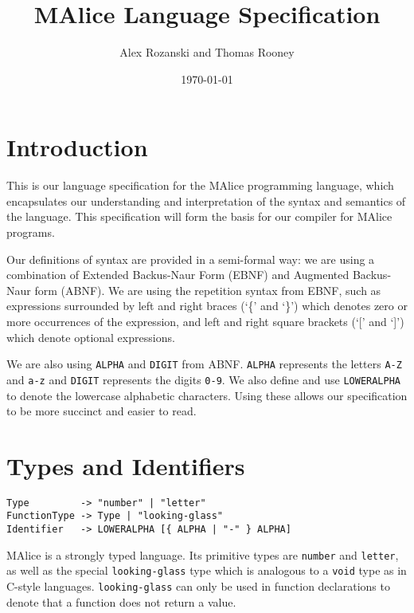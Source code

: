 \documentclass[a4wide, 11pt]{article}
\begin{document}
\title{MAlice Language Specification}

\author{Alex Rozanski and Thomas Rooney}

\date{\today}         %

\maketitle            %

\section{Introduction}

This is our language specification for the MAlice programming language, which encapsulates our understanding and interpretation of the syntax and semantics of the language. This specification will form the basis for our compiler for MAlice programs.

Our definitions of syntax are provided in a semi-formal way: we are using a combination of Extended Backus-Naur Form (EBNF) and Augmented Backus-Naur form (ABNF). We are using the repetition syntax from EBNF, such as expressions surrounded by left and right braces (`\{' and `\}') which denotes zero or more occurrences of the expression, and left and right square brackets (`[' and `]') which denote optional expressions.

We are also using \texttt{ALPHA} and \texttt{DIGIT} from ABNF. \texttt{ALPHA} represents the letters \texttt{A-Z} and \texttt{a-z} and \texttt{DIGIT} represents the digits \texttt{0-9}. We also define and use \texttt{LOWERALPHA} to denote the lowercase alphabetic characters. Using these allows our specification to be more succinct and easier to read.

\section{Types and Identifiers}

\begin{verbatim}
Type         -> "number" | "letter"
FunctionType -> Type | "looking-glass"
Identifier   -> LOWERALPHA [{ ALPHA | "-" } ALPHA]
\end{verbatim}

MAlice is a strongly typed language. Its primitive types are \texttt{number} and \texttt{letter}, as well as the special \texttt{looking-glass} type which is analogous to a \texttt{void} type as in C-style languages. \texttt{looking-glass} can only be used in function declarations to denote that a function does not return a value.
\end{document}
